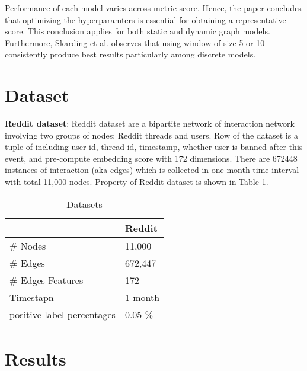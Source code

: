 \documentclass{IEEEtran}
\begin{document}
Performance of each model varies across metric score. Hence, the paper concludes that optimizing the hyperparamters is essential for obtaining a representative score. This conclusion applies for both static and dynamic graph models. Furthermore, Skarding et al. observes that using window of size 5 or 10 consistently produce best results particularly among discrete models.




\section{Dataset}
\label{sec:org0be6555}
\textbf{Reddit dataset}: Reddit dataset are a bipartite network of interaction network involving two groups of nodes: Reddit threads and users. Row of the dataset is a tuple of including user-id, thread-id, timestamp, whether user is banned after this event, and pre-compute embedding score with 172 dimensions. There are 672448 instances of interaction (aka edges) which is collected in one month time interval with total 11,000 nodes. Property of Reddit dataset is shown in Table \ref{Datasets}.

\begin{table}[htbp]
\caption{\label{Datasets}Datasets}
\centering
\begin{tabular}{ll}
\hline
\hline
 & Reddit\\
\hline
\# Nodes & 11,000\\
\# Edges & 672,447\\
\# Edges Features & 172\\
Timestapn & 1 month\\
positive label percentages & 0.05 \%\\
\end{tabular}
\end{table}

\section{Results}
\label{sec:org613bd21}
\printbibliography
\end{document}

